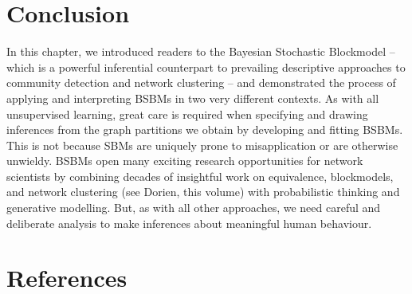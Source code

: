 \documentclass[
  12pt,
  a4paper,
  DIV=11,
  numbers=noendperiod,
  twoside,
  open=any]{scrartcl}
\begin{document}
\section{Conclusion}\label{conclusion}

In this chapter, we introduced readers to the Bayesian Stochastic
Blockmodel -- which is a powerful inferential counterpart to prevailing
descriptive approaches to community detection and network clustering --
and demonstrated the process of applying and interpreting BSBMs in two
very different contexts. As with all unsupervised learning, great care
is required when specifying and drawing inferences from the graph
partitions we obtain by developing and fitting BSBMs. This is not
because SBMs are uniquely prone to misapplication or are otherwise
unwieldy. BSBMs open many exciting research opportunities for network
scientists by combining decades of insightful work on equivalence,
blockmodels, and network clustering (see Dorien, this volume) with
probabilistic thinking and generative modelling. But, as with all other
approaches, we need careful and deliberate analysis to make inferences
about meaningful human behaviour.

\section*{References}\label{references}
\end{document}
